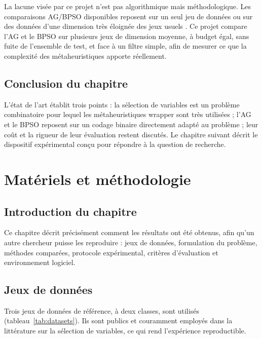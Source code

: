 \documentclass[11pt,a4paper]{report}
\begin{document}
\noindent La lacune visée par ce projet n'est pas algorithmique mais méthodologique. Les
comparaisons AG/BPSO disponibles reposent sur un seul jeu de données \cite{babaoglu2010,rafdi2021}
ou sur des données d'une dimension très éloignée des jeux usuels \cite{ludwig2025}. Ce projet
compare l'AG et le BPSO sur plusieurs jeux de dimension moyenne, à budget égal, sans fuite de
l'ensemble de test, et face à un filtre simple, afin de mesurer ce que la complexité des
métaheuristiques apporte réellement.

\section{Conclusion du chapitre}
L'état de l'art établit trois points : la sélection de variables est un problème combinatoire
pour lequel les métaheuristiques wrapper sont très utilisées ; l'AG et le BPSO reposent sur un
codage binaire directement adapté au problème ; leur coût et la rigueur de leur évaluation restent
discutés. Le chapitre suivant décrit le dispositif expérimental conçu pour répondre à la question
de recherche.

\chapter{Matériels et méthodologie}
\label{chap:methodo}
\section{Introduction du chapitre}
Ce chapitre décrit précisément comment les résultats ont été obtenus, afin qu'un autre chercheur
puisse les reproduire : jeux de données, formulation du problème, méthodes comparées, protocole
expérimental, critères d'évaluation et environnement logiciel.

\section{Jeux de données}
Trois jeux de données de référence, à deux classes, sont utilisés (tableau~\ref{tab:datasets}).
Ils sont publics et couramment employés dans la littérature sur la sélection de variables, ce
qui rend l'expérience reproductible.
\end{document}
